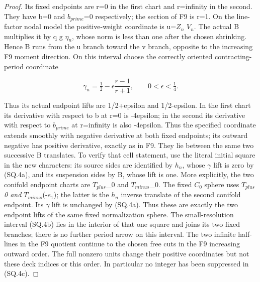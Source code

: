 \begin{proof}
Its fixed endpoints are r=0 in the first chart and r=infinity in
the second. They have b=0 and \(b_{prime}\)=0 respectively; the section
of F9 is r=1. On the line-factor nodal model the positive-weight coordinate is
u=\(Z_{n}\) \(V_{n}\). The actual B multiplies it by q g \(\eta_{n}\), whose
norm is less than one after the chosen shrinking. Hence B runs from
the u branch toward the v branch, opposite to the increasing F9
moment direction. On this interval choose the correctly oriented
contracting-period coordinate

\[
 \gamma_n=\tfrac12-\epsilon\frac{r-1}{r+1},
                       \qquad0<\epsilon<\tfrac14.       \tag{SQ.4c}
\]

Thus its actual endpoint lifts are 1/2+epsilon and 1/2-epsilon.
In the first chart its derivative with respect to b at r=0 is
-4epsilon; in the second its derivative with respect to \(b_{prime}\) at
r=infinity is also -4epsilon. Thus the specified coordinate extends
smoothly with negative derivative at both fixed endpoints; its
outward negative has positive derivative, exactly as in F9.
They lie between the same two successive B translates. To verify
that cell statement, use the literal initial square in the new
characters: its source sides are identified by \(h_{n}\), whose \(\gamma\)
lift is zero by (SQ.4a), and its suspension sides by B, whose lift
is one. More explicitly, the two conifold endpoint charts are \(T_{plus}\)\_0 and
\(T_{minus}\)\_0. The fixed \(C_{0}\) sphere uses \(T_{plus}\)\emph{0 and
\(T_{minus}\)}(-\(e_{1}\)); the latter is the \(h_{n}\) inverse translate of the
second conifold endpoint. Its \(\gamma\) lift is unchanged by (SQ.4a).
Thus these are exactly the two endpoint lifts of the same fixed
normalization sphere. The small-resolution interval (SQ.4b) lies in the interior
of that one square and joins its two fixed branches; there is no
further period arrow on this interval. The two infinite half-lines
in the F9 quotient continue to the chosen free cuts in the
F9 increasing outward order. The full nonzero units change their positive
coordinates but not these deck indices or this order. In particular
no integer has been suppressed in (SQ.4c).


\end{proof}
